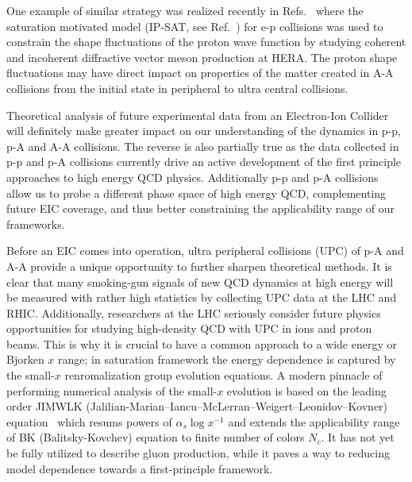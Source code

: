One example of similar strategy was realized recently in Refs.~\cite{Mantysaari:2016ykx,Mantysaari:2016jaz,Mantysaari:2017cni} 
where the saturation motivated model (IP-SAT, see Ref.~\cite{Kowalski:2003hm}) for e-p collisions  was used to constrain the 
shape fluctuations of the proton wave function by studying 
coherent and incoherent diffractive 
vector meson production at HERA. The proton shape fluctuations may have direct 
impact on properties of the matter created in A-A collisions from 
the initial state in peripheral to ultra central collisions. 



Theoretical analysis of future experimental data from an Electron-Ion Collider  will 
definitely make greater impact on our understanding of the dynamics in 
p-p, p-A and A-A collisions.  %
The reverse is also partially true as the data collected 
in p-p and p-A collisions currently drive an active 
development of the first principle approaches to 
high energy QCD physics. Additionally p-p and p-A 
collisions allow us to probe a different phase space 
of high energy  QCD, complementing future EIC coverage, and thus 
better constraining the applicability range of our frameworks. 

Before an EIC comes into operation, ultra peripheral collisions (UPC) 
of p-A and A-A provide a unique opportunity to 
further sharpen theoretical methods. It is clear that 
many smoking-gun signals of new QCD dynamics at high energy 
will be measured with rather high statistics 
by collecting UPC data at the LHC and RHIC. Additionally, researchers at the LHC 
seriously consider 
future physics opportunities for studying high-density QCD 
with UPC in ions and proton beams. This is why it is 
crucial to have a common approach to a wide energy or Bjorken $x$ range; 
in saturation framework the energy dependence  is captured by the small-$x$ 
renromalization group evolution equations.  
A modern pinnacle of performing numerical analysis of the small-$x$ evolution is based on 
the leading order  JIMWLK (Jalilian-Marian--Iancu--McLerran--Weigert--Leonidov--Kovner) equation~\cite{JalilianMarian:1997dw, 
JalilianMarian:1997gr,
Iancu:2001ad, 
Iancu:2000hn}  which resums powers of $\alpha_s \log x^{-1}$
and extends the applicability range of BK (Balitsky-Kovchev) equation \cite{Balitsky:1995ub,Balitsky:1998ya,Kovchegov:1999yj,Kovchegov:1999ua} to finite number of colors $N_c$. 
It has not yet be fully utilized to describe gluon production, 
while it paves a way to reducing model dependence towards  
a first-principle framework.  

